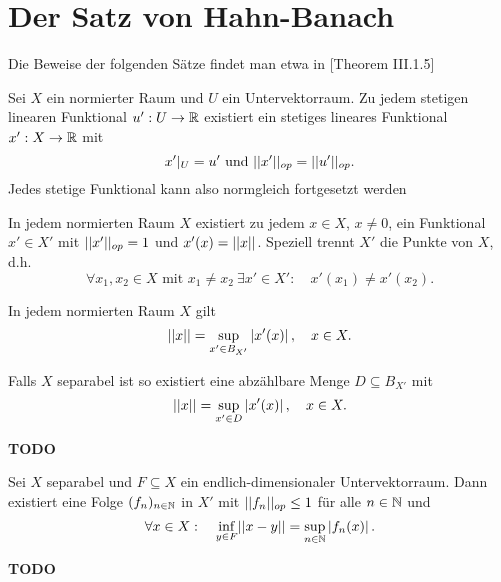 \section{Der Satz von Hahn-Banach}
Die Beweise der folgenden Sätze findet man etwa in \cite{werner}[Theorem III.1.5]
\begin{theorem}
    Sei $X$ ein normierter Raum und $U$ ein Untervektorraum. 
    Zu jedem stetigen linearen Funktional $u':U \to \mathbb{R}$ existiert ein stetiges lineares Funktional $x':X \to \mathbb{R}$ mit 
    $$
        x'|_U = u' \text{ und } \lvert\lvert x' \rvert\rvert_{op} = \lvert\lvert u' \rvert\rvert_{op}.
    $$
    Jedes stetige Funktional kann also normgleich fortgesetzt werden
\end{theorem}

\begin{corollary}
    In jedem normierten Raum $X$ existiert zu jedem $x \in X$, $x \neq 0$, ein Funktional $x' \in X'$ mit $\lvert\lvert x' \rvert\rvert_{op} = 1$ und $x'(x) = \lvert\lvert x \rvert\rvert$. 
    Speziell trennt $X'$  die Punkte von $X$, d.h.
    $$
        \forall x_1, x_2 \in X \text{ mit } x_1 \neq x_2 \ \exists x' \in X': \quad x'(x_1) \neq x'(x_2). 
    $$
\end{corollary}

\begin{corollary}
    In jedem normierten Raum $X$ gilt 
    $$
        \lvert\lvert x \rvert\rvert = \sup_{x' \in B_{X'}}\left| x'(x) \right|, \quad x \in X. 
    $$
\end{corollary}

\begin{corollary}
    Falls $X$ separabel ist so existiert eine abzählbare Menge $D \subseteq B_{X'}$ mit 
    $$
        \lvert\lvert x \rvert\rvert = \sup_{x' \in D}\left| x'(x) \right|, \quad x \in X. 
    $$
\end{corollary}

\begin{proof*}
    \textbf{TODO}
\end{proof*}

\begin{corollary}
    Sei $X$ separabel und $F \subseteq X$ ein endlich-dimensionaler Untervektorraum.
    Dann existiert eine Folge $(f_n)_{n \in \mathbb{N}}$ in $X'$ mit $\lvert\lvert f_n \rvert\rvert_{op} \leq 1$ für alle $n \in \mathbb{N}$ und 
    $$
        \forall x \in X: \quad \inf_{y \in F}\lvert\lvert x-y \rvert\rvert = \sup_{n \in \mathbb{N}}\left| f_n(x) \right|. 
    $$
\end{corollary}
\begin{proof*}
    \textbf{TODO}
\end{proof*}
